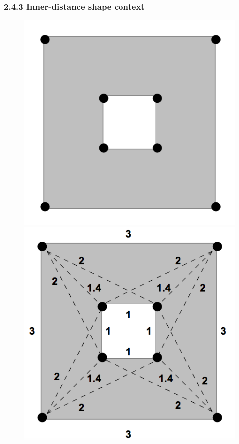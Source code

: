 \documentclass[notheorems,serif,table,compress]{beamer}  %
\begin{document}
\begin{frame}
\frametitle{2.4.3 Inner-distance shape context}
            \begin{figure}
              \centering
              \begin{minipage}[t]{0.3\linewidth}
              \includegraphics[width=1\linewidth]{in1}
              \end{minipage}
              \begin{minipage}[t]{0.29\linewidth}
              \includegraphics[width=1\linewidth]{in9}

\end{minipage}
\end{figure}
\end{frame}
\end{document}
